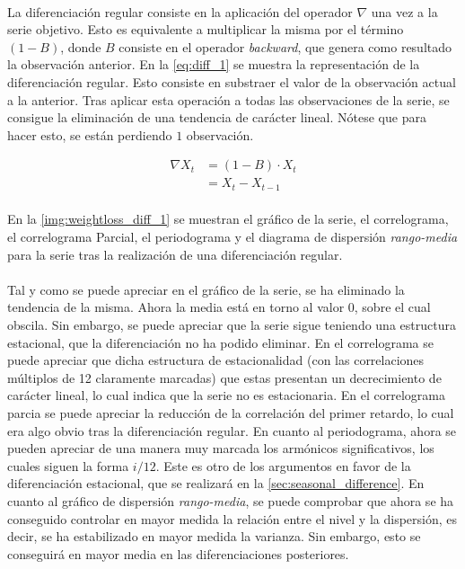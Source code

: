 \documentclass[a4paper, spanish]{article}
\begin{document}
        \paragraph{}
        La diferenciación regular consiste en la aplicación del operador $\nabla$ una vez a la serie objetivo. Esto es equivalente a multiplicar la misma por el término $(1 - B)$, donde $B$ consiste en el operador \emph{backward}, que genera como resultado la observación anterior. En la \autoref{eq:diff_1} se muestra la representación de la diferenciación regular. Esto consiste en substraer el valor de la observación actual a la anterior. Tras aplicar esta operación a todas las observaciones de la serie, se consigue la eliminación de una tendencia de carácter lineal. Nótese que para hacer esto, se están perdiendo $1$ observación.

        \begin{equation}
        \label{eq:diff_1}
          \begin{split}
            \nabla X_t
            &= (1 - B) \cdot X_t \\
            &= X_t - X_{t-1}
          \end{split}
        \end{equation}

        \paragraph{}
        En la \autoref{img:weightloss_diff_1} se muestran el gráfico de la serie, el correlograma, el correlograma Parcial, el periodograma y el diagrama de dispersión \emph{rango-media} para la serie tras la realización de una diferenciación regular.

        \paragraph{}
        Tal y como se puede apreciar en el gráfico de la serie, se ha eliminado la tendencia de la misma. Ahora la media está en torno al valor $0$, sobre el cual obscila. Sin embargo, se puede apreciar que la serie sigue teniendo una estructura estacional, que la diferenciación no ha podido eliminar. En el correlograma se puede apreciar que dicha estructura de estacionalidad (con las correlaciones múltiplos de 12 claramente marcadas) que estas presentan un decrecimiento de carácter lineal, lo cual indica que la serie no es estacionaria. En el correlograma parcia se puede apreciar la reducción de la correlación del primer retardo, lo cual era algo obvio tras la diferenciación regular. En cuanto al periodograma, ahora se pueden apreciar de una manera muy marcada los armónicos significativos, los cuales siguen la forma $i / 12$. Este es otro de los argumentos en favor de la diferenciación estacional, que se realizará en la \autoref{sec:seasonal_difference}. En cuanto al gráfico de dispersión \emph{rango-media}, se puede comprobar que ahora se ha conseguido controlar en mayor medida la relación entre el nivel y la dispersión, es decir, se ha estabilizado en mayor medida la varianza. Sin embargo, esto se conseguirá en mayor media en las diferenciaciones posteriores.
\end{document}

